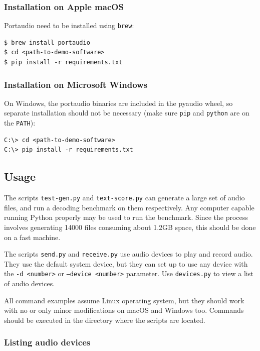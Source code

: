 \documentclass[a4paper]{article}
\begin{document}
\subsubsection{Installation on Apple macOS}

Portaudio need to be installed using \texttt{brew}:

\begin{lstlisting}
$ brew install portaudio
$ cd <path-to-demo-software>
$ pip install -r requirements.txt
\end{lstlisting}

\subsubsection{Installation on Microsoft Windows}

On Windows, the portaudio binaries are included in the pyaudio wheel, 
so separate installation should not be necessary (make sure 
\texttt{pip} and \texttt{python} are on the \texttt{PATH}):

\begin{lstlisting}
C:\> cd <path-to-demo-software>
C:\> pip install -r requirements.txt
\end{lstlisting}

\subsection{Usage}

The scripts \texttt{test-gen.py} and \texttt{text-score.py} can 
generate a large set of audio files, and run a decoding benchmark on 
them respectively. Any computer capable running Python properly may be 
used to run the benchmark. Since the process involves generating 14000 
files consuming about 1.2GB space, this should be done on a fast 
machine.

The scripts \texttt{send.py} and \texttt{receive.py} use audio devices 
to play and record audio. They use the default system device, but they 
can set up to use any device with the \texttt{-d <number>} or 
\texttt{--device <number>} parameter. Use \texttt{devices.py} to view a 
list of audio devices.

All command examples assume Linux operating system, but they should 
work with no or only minor modifications on macOS and Windows too. 
Commands should be executed in the directory where the scripts are 
located.

\subsubsection{Listing audio devices}
\end{document}
